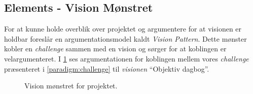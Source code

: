 \subsection{Elements - Vision Mønstret}
For at kunne holde overblik over projektet og argumentere for at visionen er holdbar foreslår \citet[Kapitel 15 - Project]{art:essence} en argumentationsmodel kaldt \emph{Vision Pattern}. 
Dette mønster kobler en \emph{challenge} sammen med en vision og sørger for at koblingen er velargumenteret.
I \cref{fig:visionpattern} ses argumentationen for koblingen mellem vores \textit{challenge} præsenteret i \cref{paradigm:challenge} til \textit{visionen} ``Objektiv dagbog''.

\begin{figure}[h]
	\centering
	\resizebox{\columnwidth}{!}{
	}
	\caption{Vision mønstret for projektet.}
	\label{fig:visionpattern}
\end{figure}
